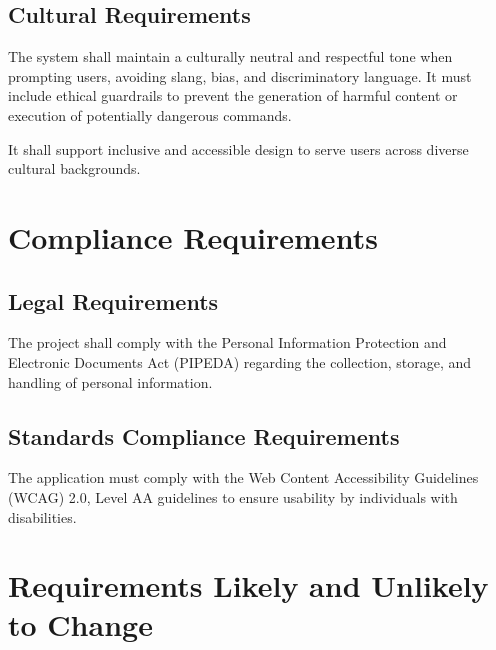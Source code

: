 \documentclass[12pt]{article}
\begin{document}
\subsection{Cultural Requirements}
The system shall maintain a culturally neutral and respectful tone when prompting users, avoiding slang, bias, and discriminatory language. It must include ethical guardrails to prevent the generation of harmful content or execution of potentially dangerous commands.

It shall support inclusive and accessible design to serve users across diverse cultural backgrounds.

\section{Compliance Requirements}
\subsection{Legal Requirements}
The project shall comply with the Personal Information Protection and Electronic Documents Act (PIPEDA) regarding the collection, storage, and handling of personal information.

\subsection{Standards Compliance Requirements}
The application must comply with the Web Content Accessibility Guidelines (WCAG) 2.0, Level AA guidelines to ensure usability by individuals with disabilities.

\section{Requirements Likely and Unlikely to Change}
\end{document}
